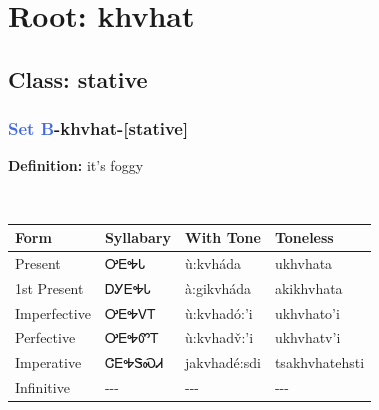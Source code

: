 \needspace{4in}
\section*{Root: khvhat}
\nopagebreak
{}
\needspace{3in}
\subsection*{Class: stative}
\nopagebreak
\needspace{2in}
\subsubsection*{\textcolor{RoyalBlue}{Set B}{-}\textbf{khvhat}{-}[stative]}
\nopagebreak
\textbf{Definition: } it{\textquoteright}s foggy
\\[0.5em]
\begin{tabularx}{\textwidth}{l X X X}%
\toprule%
\textbf{Form}&\textbf{Syllabary}&\textbf{With Tone}&\textbf{Toneless}\\%
\midrule%
Present&ᎤᎬᎭᏓ&ù:kvháda&ukhvhata\\%
1st Present&ᎠᎩᎬᎭᏓ&à:gikvháda&akikhvhata\\%
Imperfective&ᎤᎬᎭᏙᎢ&ù:kvhadó:’i&ukhvhato'i\\%
Perfective&ᎤᎬᎭᏛᎢ&ù:kvhadv̌:’i&ukhvhatv'i\\%
Imperative&ᏣᎬᎭᏕᏍᏗ&jakvhadé:sdi&tsakhvhatehsti\\%
Infinitive&{-}{-}{-}&{-}{-}{-}&{-}{-}{-}\\%
\bottomrule%
\end{tabularx}
\\[1em]